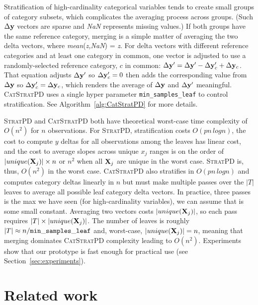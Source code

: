 \documentclass{article}
\newcommand{\secref}[1]{Section~\ref{#1}}
\newcommand{\algref}[1]{Algorithm~\ref{#1}}
\newcommand{\spd}{\fontfamily{cmr}\textsc{\small StratPD}}
\newcommand{\cspd}{\fontfamily{cmr}\textsc{\small CatStratPD}}
\begin{document}
Stratification of high-cardinality categorical variables tends to create small groups of category subsets, which complicates the averaging process across groups. (Such $\Delta {\bf y}$ vectors are sparse and {\it NaN} represents missing values.) If both groups have the same reference category, merging is a simple matter of averaging the two delta vectors, where {\it mean}({\it z,NaN}) = {\it z}.  For delta vectors with different reference categories and at least one category in common, one vector is adjusted to use a randomly-selected reference category, $c$ in common: $\Delta {\bf y}' = \Delta {\bf y}' - \Delta {\bf y}_c' + \Delta {\bf y}_c$. That equation adjusts $\Delta {\bf y}'$ so $\Delta {\bf y}_c'=0$ then adds the corresponding value from $\Delta {\bf y}$ so $\Delta {\bf y}_c' = \Delta {\bf y}_c$, which renders the average of $\Delta {\bf y}$ and $\Delta {\bf y}'$ meaningful.  \cspd{} uses a single hyper parameter {\tt\small min\_samples\_leaf} to control stratification. See \algref{alg:CatStratPD} for more details.

\spd{} and \cspd{} both have theoretical worst-case time complexity of $O(n^2)$ for $n$ observations. For \spd{}, stratification costs $O(p n \,log n)$, the cost to compute $y$ deltas for all observations among the leaves has linear cost, and the cost to average slopes across unique $x_j$ ranges is on the order of $|unique({\bf X}_j)| \times n$ or $n^2$ when all ${\bf X}_j$ are unique in the worst case. \spd{} is, thus, $O(n^2)$ in the worst case.  \cspd{} also stratifies in $O(p n \,log n)$ and computes category deltas linearly in $n$ but must make multiple passes over the $|T|$ leaves to average all possible leaf category delta vectors.  In practice, three passes is the max we have seen (for high-cardinality variables), we can assume that is some small constant. Averaging two vectors costs $|unique({\bf X}_j)|$, so each pass requires $|T| \times |unique({\bf X}_j)|$. The number of leaves is roughly $|T| \approx n / {\tt\small min\_samples\_leaf}$ and, worst-case, $|unique({\bf X}_j)|=n$, meaning that merging dominates \cspd{} complexity leading to $O(n^2)$.  Experiments show that our prototype is fast enough for practical use (see \secref{sec:experiments}).

\section{Related work}\label{sec:related}
\end{document}
